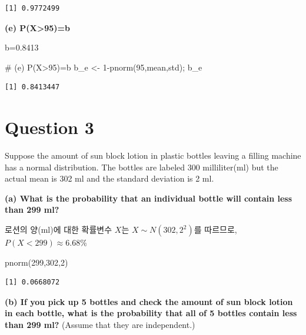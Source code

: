 \documentclass[
  a4paper,
  DIV=11,
  numbers=noendperiod]{scrreprt}
\newenvironment{Shaded}{\begin{snugshade}}{\end{snugshade}}
\newcommand{\CommentTok}[1]{\textcolor[rgb]{0.37,0.37,0.37}{#1}}
\newcommand{\DecValTok}[1]{\textcolor[rgb]{0.68,0.00,0.00}{#1}}
\newcommand{\FunctionTok}[1]{\textcolor[rgb]{0.28,0.35,0.67}{#1}}
\newcommand{\NormalTok}[1]{\textcolor[rgb]{0.00,0.23,0.31}{#1}}
\newcommand{\OtherTok}[1]{\textcolor[rgb]{0.00,0.23,0.31}{#1}}
\newcommand{\SpecialCharTok}[1]{\textcolor[rgb]{0.37,0.37,0.37}{#1}}
\begin{document}
\begin{verbatim}
[1] 0.9772499
\end{verbatim}

\textbf{(e) P(X\textgreater95)=b}

b=0.8413

\begin{Shaded}
\begin{Highlighting}[]
\CommentTok{\# (e) P(X\textgreater{}95)=b}
\NormalTok{b\_e }\OtherTok{\textless{}{-}} \DecValTok{1}\SpecialCharTok{{-}}\FunctionTok{pnorm}\NormalTok{(}\DecValTok{95}\NormalTok{,mean,std); b\_e}
\end{Highlighting}
\end{Shaded}

\begin{verbatim}
[1] 0.8413447
\end{verbatim}

\section*{Question 3}\label{question-3-1}


Suppose the amount of sun block lotion in plastic bottles leaving a
filling machine has a normal distribution. The bottles are labeled 300
milliliter(ml) but the actual mean is 302 ml and the standard deviation
is 2 ml.

\textbf{(a) What is the probability that an individual bottle will
contain less than 299 ml?}

로션의 양(ml)에 대한 확률변수 \(X\)는 \(X\sim N(302,2^2)\)를 따르므로,
\(P(X<299)\approx 6.68\%\)

\begin{Shaded}
\begin{Highlighting}[]
\FunctionTok{pnorm}\NormalTok{(}\DecValTok{299}\NormalTok{,}\DecValTok{302}\NormalTok{,}\DecValTok{2}\NormalTok{)}
\end{Highlighting}
\end{Shaded}

\begin{verbatim}
[1] 0.0668072
\end{verbatim}

\textbf{(b) If you pick up 5 bottles and check the amount of sun block
lotion in each bottle, what is the probability that all of 5 bottles
contain less than 299 ml?} (Assume that they are independent.)
\end{document}
